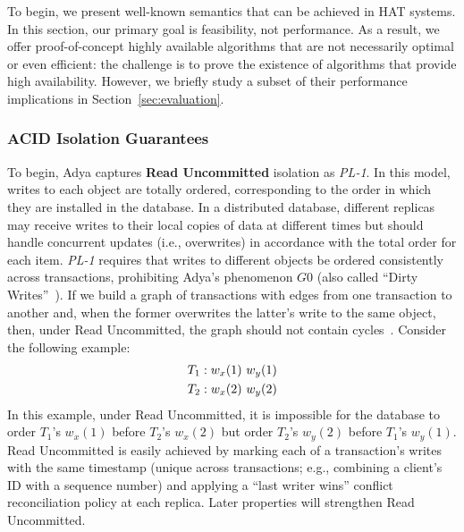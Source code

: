 To begin, we present well-known semantics that can be achieved in HAT
systems. In this section, our primary goal is feasibility, not
performance. As a result, we offer proof-of-concept highly available
algorithms that are not necessarily optimal or even efficient: the
challenge is to prove the existence of algorithms that provide high
availability. However, we briefly study a subset of their performance
implications in Section~\ref{sec:evaluation}.

\subsubsection{ACID Isolation Guarantees}
\label{sec:isolation}

To begin, Adya captures \textbf{Read Uncommitted} isolation as
\textit{PL-1}. In this model, writes to each object are totally
ordered, corresponding to the order in which they are installed in the
database. In a distributed database, different replicas may receive
writes to their local copies of data at different times but should
handle concurrent updates (i.e., overwrites) in accordance with the
total order for each item. \textit{PL-1} requires that writes to
different objects be ordered consistently across transactions,
prohibiting Adya's phenomenon $G0$ (also called ``Dirty
Writes''~\cite{ansicritique}). If we build a graph of transactions
with edges from one transaction to another and, when the former
overwrites the latter's write to the same object, then, under Read
Uncommitted, the graph should not contain cycles~\cite{adya}. Consider
the following example:
\begin{align*}
\small\vspace{-1em}
T_1 &: w_x(1)~w_y(1)
\\T_2 &: w_x(2)~w_y(2)
\end{align*}
In this example, under Read Uncommitted, it is impossible for the
database to order $T_1$'s $w_x(1)$ before $T_2$'s $w_x(2)$ but order
$T_2$'s $w_y(2)$ before $T_1$'s $w_y(1)$. Read Uncommitted is easily
achieved by marking each of a transaction's writes with the same
timestamp (unique across transactions; e.g., combining a client's ID
with a sequence number) and applying a ``last writer wins'' conflict
reconciliation policy at each replica. Later properties will
strengthen Read Uncommitted.

